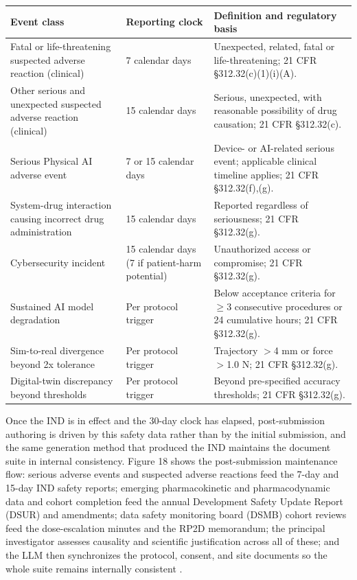 \noindent\begin{tabularx}{\textwidth}{L{4.4cm} C{2.2cm} Y}
\toprule
\textbf{Event class} & \textbf{Reporting clock} & \textbf{Definition and regulatory basis} \\
\midrule
Fatal or life-threatening suspected adverse reaction (clinical) & 7 calendar days & Unexpected, related, fatal or life-threatening; 21 CFR \S 312.32(c)(1)(i)(A). \\
Other serious and unexpected suspected adverse reaction (clinical) & 15 calendar days & Serious, unexpected, with reasonable possibility of drug causation; 21 CFR \S 312.32(c). \\
Serious Physical AI adverse event & 7 or 15 calendar days & Device- or AI-related serious event; applicable clinical timeline applies; 21 CFR \S 312.32(f),(g). \\
System-drug interaction causing incorrect drug administration & 15 calendar days & Reported regardless of seriousness; 21 CFR \S 312.32(g). \\
Cybersecurity incident & 15 calendar days (7 if patient-harm potential) & Unauthorized access or compromise; 21 CFR \S 312.32(g). \\
Sustained AI model degradation & Per protocol trigger & Below acceptance criteria for $\geq$3 consecutive procedures or 24 cumulative hours; 21 CFR \S 312.32(g). \\
Sim-to-real divergence beyond 2x tolerance & Per protocol trigger & Trajectory $>$4 mm or force $>$1.0 N; 21 CFR \S 312.32(g). \\
Digital-twin discrepancy beyond thresholds & Per protocol trigger & Beyond pre-specified accuracy thresholds; 21 CFR \S 312.32(g). \\
\bottomrule
\end{tabularx}
\vspace{-0.2cm}

Once the IND is in effect and the 30-day clock has elapsed, post-submission
authoring is driven by this safety data rather than by the initial submission, and
the same generation method that produced the IND maintains the document suite in
internal consistency. Figure 18 shows the post-submission maintenance flow:
serious adverse events and suspected adverse reactions feed the 7-day and 15-day
IND safety reports; emerging pharmacokinetic and pharmacodynamic data and cohort
completion feed the annual Development Safety Update Report (DSUR) and amendments;
data safety monitoring board (DSMB) cohort reviews feed the dose-escalation minutes
and the RP2D memorandum; the principal investigator assesses causality and
scientific justification across all of these; and the LLM then synchronizes the
protocol, consent, and site documents so the whole suite remains internally
consistent \cite{onpremwhippl, ichpaistduni}.

